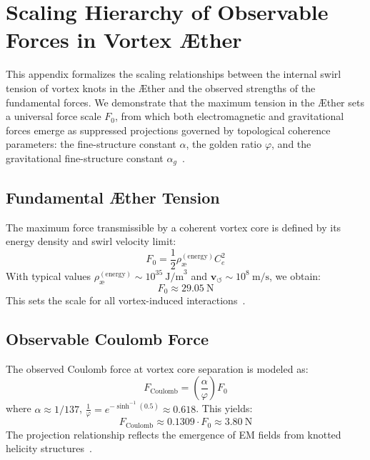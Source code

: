 \documentclass[preprint]{revtex4-2}
\begin{document}
        \section{Scaling Hierarchy of Observable Forces in Vortex \AE ther}\label{sec:force_scaling}
            This appendix formalizes the scaling relationships between the internal swirl tension of vortex knots in the \AE ther and the observed strengths of the fundamental forces. We demonstrate that the maximum tension in the \AE ther sets a universal force scale \( F_0 \), from which both electromagnetic and gravitational forces emerge as suppressed projections governed by topological coherence parameters: the fine-structure constant \( \alpha \), the golden ratio \( \varphi \), and the gravitational fine-structure constant \( \alpha_g \)~\cite{ranada1990topological, volovik2003universe}.
        
            \subsection{Fundamental Æther Tension}
            The maximum force transmissible by a coherent vortex core is defined by its energy density and swirl velocity limit:
            \begin{equation}
                F_0 = \frac{1}{2} \rho_{\text{\ae}}^{(\text{energy})} C_e^2
            \label{eq:max_core_force}
            \end{equation}
            With typical values \( \rho_{\text{\ae}}^{(\text{energy})} \sim 10^{35}~\text{J/m}^3 \) and \( \mathbf{v}_{\scriptscriptstyle\boldsymbol{\circlearrowleft}} \sim 10^8~\text{m/s} \), we obtain:
            \begin{equation}
                F_0 \approx 29.05~\text{N}
            \end{equation}
            This sets the scale for all vortex-induced interactions~\cite{volovik2003universe}.
        
            \subsection{Observable Coulomb Force}
            The observed Coulomb force at vortex core separation is modeled as:
            \begin{equation}
                F_\text{Coulomb} = \left( \frac{\alpha}{\varphi} \right) F_0
            \end{equation}
            where \( \alpha \approx 1/137 \), \( \frac{1}{\varphi} = e^{-\sinh^{-1}(0.5)} \approx 0.618 \). This yields:
            \begin{equation}
                F_\text{Coulomb} \approx 0.1309 \cdot F_0 \approx 3.80~\text{N}
            \end{equation}
            The projection relationship reflects the emergence of EM fields from knotted helicity structures~\cite{kiehn2005topological}.
        
\end{document}
